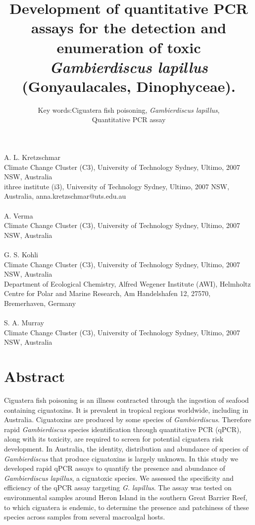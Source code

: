 \documentclass[12pt]{article}
\title{Development of quantitative PCR assays for the detection and enumeration of toxic \emph{Gambierdiscus lapillus} (Gonyaulacales, Dinophyceae).} %
\author{Key words:Ciguatera fish poisoning, \emph{Gambierdiscus lapillus},\\
 Quantitative PCR assay}%
\date{}
\begin{document}
\maketitle
\paragraph{}A. L. Kretzschmar\\
Climate Change Cluster (C3), University of Technology Sydney, Ultimo, 2007 NSW, Australia\\
ithree institute (i3), University of Technology Sydney, Ultimo, 2007 NSW, Australia, anna.kretzschmar@uts.edu.au
\paragraph{}A. Verma \\
Climate Change Cluster (C3), University of Technology Sydney, Ultimo, 2007 NSW, Australia
\paragraph{}G. S. Kohli\\
Climate Change Cluster (C3), University of Technology Sydney, Ultimo, 2007 NSW, Australia\\
Department of Ecological Chemistry, Alfred Wegener Institute (AWI), Helmholtz Centre for Polar and Marine Research, Am Handelshafen 12, 27570, Bremerhaven, Germany
\paragraph{}S. A. Murray\\
Climate Change Cluster (C3), University of Technology Sydney, Ultimo, 2007 NSW, Australia
\newpage
\section*{Abstract}
Ciguatera fish poisoning is an illness contracted through the ingestion of seafood containing ciguatoxins. 
It is prevalent in tropical regions worldwide, including in Australia. 
Ciguatoxins are produced by some species of \emph{Gambierdiscus}. 
Therefore rapid \emph{Gambierdiscus} species identification through quantitative PCR (qPCR), along with its toxicity, are required to screen for potential ciguatera risk development. 
In Australia, the identity, distribution and abundance of species of \textit{Gambierdiscus} that produce ciguatoxins is largely unknown. 
In this study we developed rapid qPCR assays to quantify the presence and abundance of \textit{Gambierdiscus lapillus}, a ciguatoxic species. %
We assessed the specificity and efficiency of the  qPCR assay targeting \textit{G. lapillus}. %
The assay was tested on environmental samples around Heron Island in the southern Great Barrier Reef, to which ciguatera is endemic, to determine the presence and patchiness of these species across samples from several macroalgal hosts.  
\end{document}
